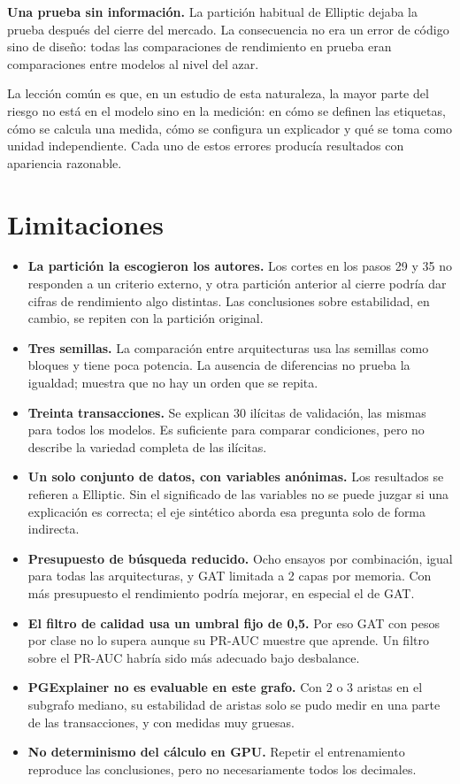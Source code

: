 \textbf{Una prueba sin información.} La partición habitual de Elliptic dejaba la prueba después
del cierre del mercado. La consecuencia no era un error de código sino de diseño: todas las
comparaciones de rendimiento en prueba eran comparaciones entre modelos al nivel del azar.

La lección común es que, en un estudio de esta naturaleza, la mayor parte del riesgo no está en
el modelo sino en la medición: en cómo se definen las etiquetas, cómo se calcula una medida,
cómo se configura un explicador y qué se toma como unidad independiente. Cada uno de estos
errores producía resultados con apariencia razonable.

\section{Limitaciones}\label{sec:dis_limitaciones}

\begin{itemize}
  \item \textbf{La partición la escogieron los autores.} Los cortes en los pasos 29 y 35 no
        responden a un criterio externo, y otra partición anterior al cierre podría dar cifras de
        rendimiento algo distintas. Las conclusiones sobre estabilidad, en cambio, se repiten
        con la partición original.
  \item \textbf{Tres semillas.} La comparación entre arquitecturas usa las semillas como bloques
        y tiene poca potencia. La ausencia de diferencias no prueba la igualdad; muestra que no
        hay un orden que se repita.
  \item \textbf{Treinta transacciones.} Se explican 30 ilícitas de validación, las mismas para
        todos los modelos. Es suficiente para comparar condiciones, pero no describe la
        variedad completa de las ilícitas.
  \item \textbf{Un solo conjunto de datos, con variables anónimas.} Los resultados se refieren a
        Elliptic. Sin el significado de las variables no se puede juzgar si una explicación es
        correcta; el eje sintético aborda esa pregunta solo de forma indirecta.
  \item \textbf{Presupuesto de búsqueda reducido.} Ocho ensayos por combinación, igual para
        todas las arquitecturas, y GAT limitada a 2 capas por memoria. Con más presupuesto el
        rendimiento podría mejorar, en especial el de GAT.
  \item \textbf{El filtro de calidad usa un umbral fijo de 0,5.} Por eso GAT con pesos por
        clase no lo supera aunque su PR-AUC muestre que aprende. Un filtro sobre el PR-AUC
        habría sido más adecuado bajo desbalance.
  \item \textbf{PGExplainer no es evaluable en este grafo.} Con 2 o 3 aristas en el subgrafo
        mediano, su estabilidad de aristas solo se pudo medir en una parte de las
        transacciones, y con medidas muy gruesas.
  \item \textbf{No determinismo del cálculo en GPU.} Repetir el entrenamiento reproduce las
        conclusiones, pero no necesariamente todos los decimales.
\end{itemize}
